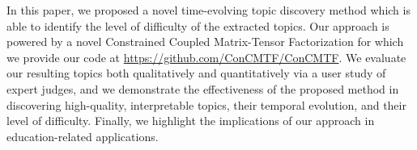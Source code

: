 In this paper, we proposed a novel time-evolving topic discovery method which is able to identify the level of difficulty of the extracted topics. Our approach is powered by a novel Constrained Coupled Matrix-Tensor Factorization for which we provide our code at \url{https://github.com/ConCMTF/ConCMTF}. We evaluate our resulting topics both qualitatively and quantitatively via a user study of expert judges, and we demonstrate the effectiveness of the proposed method in discovering high-quality, interpretable topics, their temporal evolution, and their level of difficulty.  Finally, we highlight the implications of our approach in education-related applications.%

